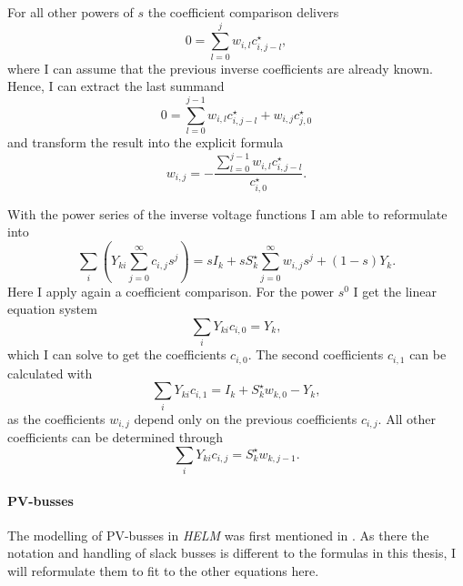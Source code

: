 For all other powers of $s$ the coefficient comparison delivers
\begin{equation}
	0 = \sum_{l = 0}^j w_{i,l} c_{i,j - l}^\star,
\end{equation}
where I can assume that the previous inverse coefficients are already known. Hence, I can extract the last summand
\begin{equation}
	0 = \sum_{l = 0}^{j - 1} w_{i,l} c_{i,j - l}^\star + w_{i,j} c_{j,0}^\star
\end{equation}
and transform the result into the explicit formula 
\begin{equation}
	w_{i,j} = - \frac{\sum_{l = 0}^{j - 1} w_{i,l} c_{i,j - l}^\star}{c_{i,0}^\star}.
\end{equation}

With the power series of the inverse voltage functions I am able to reformulate  into
\begin{equation}
	\sum_i \left( Y_{ki} \sum_{j = 0}^\infty c_{i,j} s^j \right) = s I_k + s S_k^\star \sum_{j = 0}^\infty w_{i,j} s^j + (1 - s) Y_k.
\end{equation}
Here I apply again a coefficient comparison. For the power $s^0$ I get the linear equation system
\begin{equation}
	\sum_i Y_{ki} c_{i,0} = Y_k,
	\label{eq:helm_first_coefficients}
\end{equation}
which I can solve to get the coefficients $c_{i,0}$. The second coefficients $c_{i,1}$ can be calculated with
\begin{equation}
	\sum_i Y_{ki} c_{i,1} = I_k + S_k^\star w_{k,0} - Y_k,
	\label{eq:helm_second_coefficients}
\end{equation}
as the coefficients $w_{i,j}$ depend only on the previous coefficients $c_{i,j}$. All other coefficients can be determined through
\begin{equation}
	\sum_i Y_{ki} c_{i,j} = S_k^\star w_{k,j - 1}.
	\label{eq:helm_other_coefficients}
\end{equation}

\paragraph{PV-busses}

The modelling of PV-busses in \emph{HELM} was first mentioned in \citep{helmPV}. As there the notation and handling of slack busses is different to the formulas in this thesis, I will reformulate them to fit to the other equations here.

